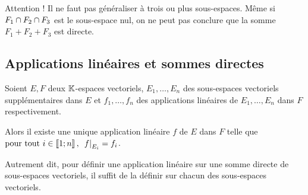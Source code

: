 Attention ! Il ne faut pas généraliser à trois ou plus sous-espaces. Même si \(F_1\cap F_2\cap F_3\) est le sous-espace nul, on ne peut pas conclure que la somme \(F_1+F_2+F_3\) est directe.

\subsection{Applications linéaires et sommes directes}

\begin{prop}
Soient \(E,F\) deux \(\mathbb{K}\)-espaces vectoriels, \(E_1,\dots,E_n\) des sous-espaces vectoriels supplémentaires dans \(E\) et \(f_1,\dots,f_n\) des applications linéaires de \(E_1,\dots,E_n\) dans \(F\) respectivement.

Alors il existe une unique application linéaire \(f\) de \(E\) dans \(F\) telle que \(\quantifs{\tpt i\in\interventierii{1}{n}}\restr{f}{E_i}=f_i\).
\end{prop}

Autrement dit, pour définir une application linéaire sur une somme directe de sous-espaces vectoriels, il suffit de la définir sur chacun des sous-espaces vectoriels.

